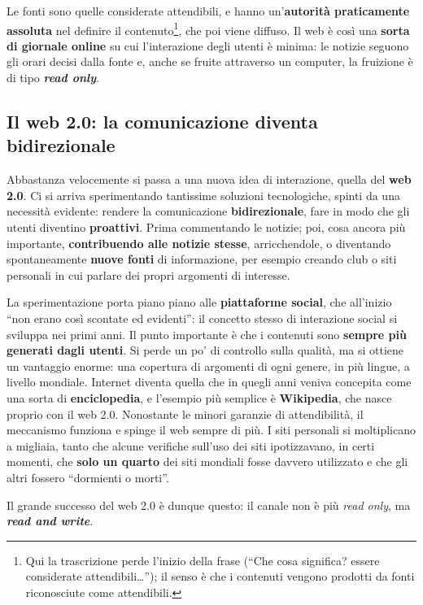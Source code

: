 Le fonti sono quelle considerate attendibili, e hanno un'\textbf{autorità
praticamente assoluta} nel definire il contenuto\footnote{Qui la trascrizione
perde l'inizio della frase (``Che cosa significa? essere considerate
attendibili\dots''); il senso è che i contenuti vengono prodotti da fonti
riconosciute come attendibili.}, che poi viene diffuso. Il web è così una
\textbf{sorta di giornale online} su cui l'interazione degli utenti è minima: le
notizie seguono gli orari decisi dalla fonte e, anche se fruite attraverso un
computer, la fruizione è di tipo \textbf{\emph{read only}}.

\subsection{Il web 2.0: la comunicazione diventa bidirezionale}

Abbastanza velocemente si passa a una nuova idea di interazione, quella del
\textbf{web 2.0}. Ci si arriva sperimentando tantissime soluzioni tecnologiche,
spinti da una necessità evidente: rendere la comunicazione
\textbf{bidirezionale}, fare in modo che gli utenti diventino
\textbf{proattivi}. Prima commentando le notizie; poi, cosa ancora più
importante, \textbf{contribuendo alle notizie stesse}, arricchendole, o
diventando spontaneamente \textbf{nuove fonti} di informazione, per esempio
creando club o siti personali in cui parlare dei propri argomenti di interesse.

La sperimentazione porta piano piano alle \textbf{piattaforme social}, che
all'inizio ``non erano così scontate ed evidenti'': il concetto stesso di
interazione social si sviluppa nei primi anni. Il punto importante è che i
contenuti sono \textbf{sempre più generati dagli utenti}. Si perde un po' di
controllo sulla qualità, ma si ottiene un vantaggio enorme: una copertura di
argomenti di ogni genere, in più lingue, a livello mondiale. Internet diventa
quella che in quegli anni veniva concepita come una sorta di
\textbf{enciclopedia}, e l'esempio più semplice è \textbf{Wikipedia}, che nasce
proprio con il web 2.0. Nonostante le minori garanzie di attendibilità, il
meccanismo funziona e spinge il web sempre di più. I siti personali si
moltiplicano a migliaia, tanto che alcune verifiche sull'uso dei siti
ipotizzavano, in certi momenti, che \textbf{solo un quarto} dei siti mondiali
fosse davvero utilizzato e che gli altri fossero ``dormienti o morti''.

Il grande successo del web 2.0 è dunque questo: il canale non è più
\emph{read only}, ma \textbf{\emph{read and write}}.

